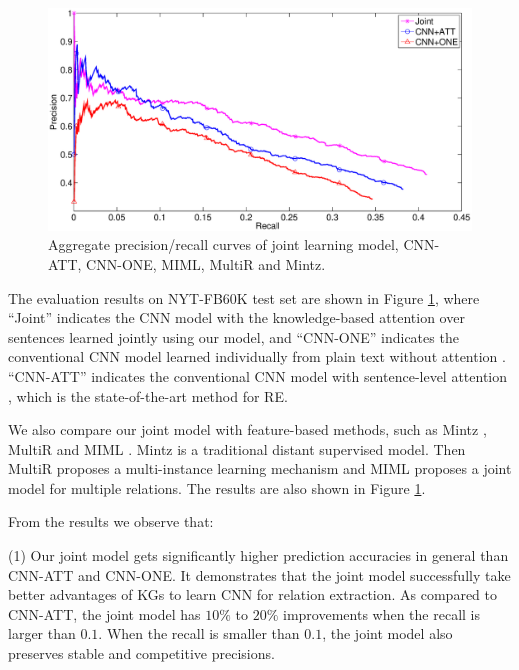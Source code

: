 \documentclass[11pt,a4paper]{article}
\begin{document}
\begin{figure}[t]
\centering
\includegraphics[width=1\columnwidth]{jointcnn.eps}
\caption{Aggregate precision/recall curves of joint learning model, CNN-ATT, CNN-ONE, MIML, MultiR and Mintz.}
\label{fig:jointcnn}
\end{figure} 


The evaluation results on NYT-FB60K test set are shown in Figure \ref{fig:jointcnn}, where ``Joint'' indicates the CNN model with the knowledge-based attention over sentences learned jointly using our model, and ``CNN-ONE'' indicates the conventional CNN model learned individually from plain text without attention \cite{zeng2014relation}. ``CNN-ATT'' indicates the conventional CNN model with sentence-level attention \cite{lin2016neural}, which is the state-of-the-art method for RE. 

We also compare our joint model with feature-based methods, such as Mintz \cite{mintz2009distant}, MultiR \cite{hoffmann2011knowledge} and MIML \cite{surdeanu2012multi}. Mintz is a traditional distant supervised model. Then MultiR proposes a multi-instance learning mechanism and MIML proposes a joint model for multiple relations. The results are also shown in Figure \ref{fig:jointcnn}. 

From the results we observe that: 


(1) Our joint model gets significantly higher prediction accuracies in general than CNN-ATT and CNN-ONE. It demonstrates that the joint model successfully take better advantages of KGs to learn CNN for relation extraction. As compared to CNN-ATT, the joint model has $10\%$ to $20\%$ improvements when the recall is larger than $0.1$. When the recall is smaller than $0.1$, the joint model also preserves stable and competitive precisions.
\end{document}

